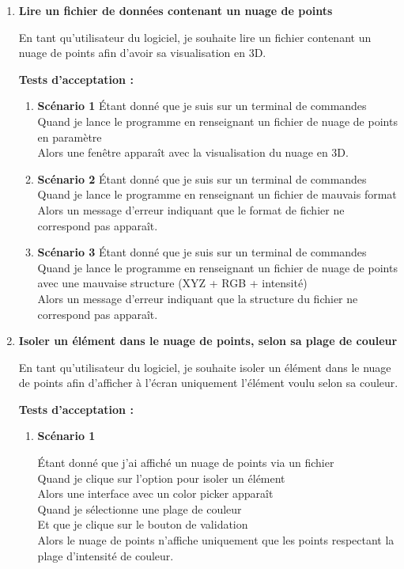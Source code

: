 \documentclass[12pt,titlepage,french]{article}
\begin{document}
\begin{enumerate}
    \item \textbf{Lire un fichier de données contenant un nuage de points}
    
En tant qu'utilisateur du logiciel, je souhaite lire un fichier contenant un nuage de points afin d'avoir sa visualisation en 3D.

\textbf{Tests d'acceptation :}

\begin{enumerate}
    \item \textbf{Scénario 1}
Étant donné que je suis sur un terminal de commandes\\
Quand je lance le programme en renseignant un fichier de nuage de points en paramètre\\
Alors une fenêtre apparaît avec la visualisation du nuage en 3D.

    \item \textbf{Scénario 2}
Étant donné que je suis sur un terminal de commandes\\
Quand je lance le programme en renseignant un fichier de mauvais format\\
Alors un message d'erreur indiquant que le format de fichier ne correspond pas apparaît.

    \item \textbf{Scénario 3}
Étant donné que je suis sur un terminal de commandes\\
Quand je lance le programme en renseignant un fichier de nuage de points avec une mauvaise structure (XYZ + RGB + intensité)\\
Alors un message d'erreur indiquant que la structure du fichier ne correspond pas apparaît.

\end{enumerate}

    \item \textbf{Isoler un élément dans le nuage de points, selon sa plage de couleur}
    
En tant qu'utilisateur du logiciel, je souhaite isoler un élément dans le nuage de points afin d'afficher à l'écran uniquement l'élément voulu selon sa couleur.

\textbf{Tests d'acceptation :}

\begin{enumerate}
    \item \textbf{Scénario 1}
    
Étant donné que j'ai affiché un nuage de points via un fichier\\
Quand je clique sur l'option pour isoler un élément\\
Alors une interface avec un color picker apparaît\\
Quand je sélectionne une plage de couleur\\
Et que je clique sur le bouton de validation\\
Alors le nuage de points n'affiche uniquement que les points respectant la plage d'intensité de couleur.


\end{enumerate}
\end{enumerate}
\end{document}
